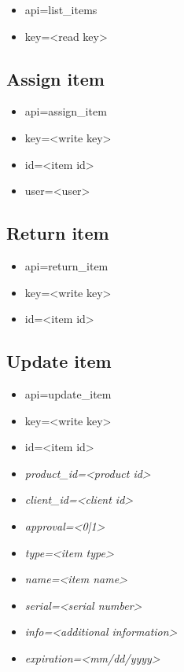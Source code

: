 \documentclass[11pt]{article}
\begin{document}
\begin{itemize}
\item api=list\_items
\item key=<read key>
\end{itemize}

\subsection{Assign item}

\begin{itemize}
\item api=assign\_item
\item key=<write key>
\item id=<item id>
\item user=<user>
\end{itemize}

\subsection{Return item}

\begin{itemize}
\item api=return\_item
\item key=<write key>
\item id=<item id>
\end{itemize}

\subsection{Update item}

\begin{itemize}
\item api=update\_item
\item key=<write key>
\item id=<item id>
\item \textit{product\_id=<product id>}
\item \textit{client\_id=<client id>}
\item \textit{approval=<0|1>}
\item \textit{type=<item type>}
\item \textit{name=<item name>}
\item \textit{serial=<serial number>}
\item \textit{info=<additional information>}
\item \textit{expiration=<mm/dd/yyyy>}
\end{itemize}
\end{document}
